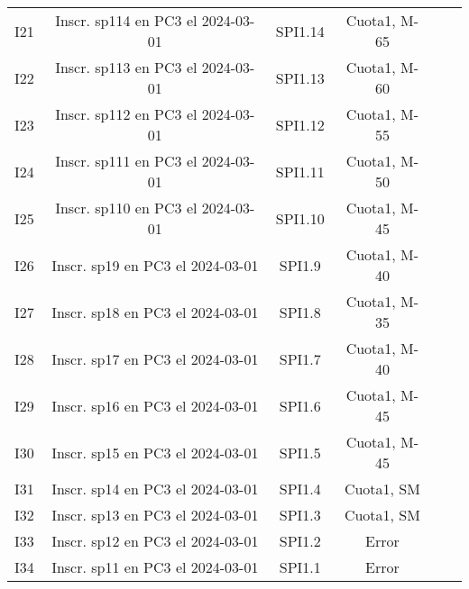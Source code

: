 \begin{table}[H]
{\begin{tabular}{|c|c|c|c|c|c|}
			I21 & Inscr. sp114 en PC3 el 2024-03-01 & SPI1.14 & Cuota1, M-65 & \OK \\
			I22 & Inscr. sp113 en PC3 el 2024-03-01 & SPI1.13 & Cuota1, M-60 & \OK \\
			I23 & Inscr. sp112 en PC3 el 2024-03-01 & SPI1.12 & Cuota1, M-55 & \OK \\
			I24 & Inscr. sp111 en PC3 el 2024-03-01 & SPI1.11 & Cuota1, M-50 & \OK \\
			I25 & Inscr. sp110 en PC3 el 2024-03-01 & SPI1.10 & Cuota1, M-45 & \OK \\
			I26 & Inscr. sp19 en PC3 el 2024-03-01 & SPI1.9 & Cuota1, M-40 & \OK \\
			I27 & Inscr. sp18 en PC3 el 2024-03-01 & SPI1.8 & Cuota1, M-35 & \MAL{Cuota1, SM} \\
			I28 & Inscr. sp17 en PC3 el 2024-03-01 & SPI1.7 & Cuota1, M-40 & \OK \\
			I29 & Inscr. sp16 en PC3 el 2024-03-01 & SPI1.6 & Cuota1, M-45 & \OK \\
			I30 & Inscr. sp15 en PC3 el 2024-03-01 & SPI1.5 & Cuota1, M-45 & \OK \\
			I31 & Inscr. sp14 en PC3 el 2024-03-01 & SPI1.4 & Cuota1, SM & \OK \\
			I32 & Inscr. sp13 en PC3 el 2024-03-01 & SPI1.3 & Cuota1, SM & \MAL{menor de edad} \\
			I33 & Inscr. sp12 en PC3 el 2024-03-01 & SPI1.2 & Error & \OK \\
			I34 & Inscr. sp11 en PC3 el 2024-03-01 & SPI1.1 & Error & \OK \\
			\hline
		\end{tabular}
	}

\end{table}
